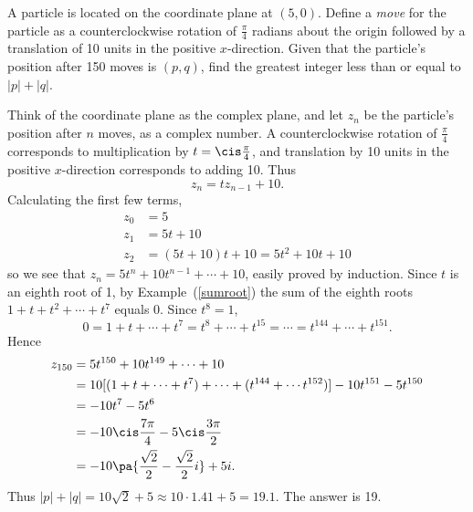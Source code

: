 \begin{ex}[AIME2 2008/9] 
A particle is located on the coordinate plane at $(5,0)$. Define a {\it move} for the particle as a counterclockwise rotation of $\frac{\pi}{4}$ radians about the origin followed by a translation of 10 units in the positive $x$-direction. Given that the particle's position after 150 moves is $(p,q)$, find the greatest integer less than or equal to $|p|+|q|$.
\end{ex}
 Think of the coordinate plane as the complex plane, and let $z_n$ be the particle's position after $n$ moves, as a complex number. A counterclockwise rotation of $\frac{\pi}{4}$ corresponds to multiplication by $t=\cis\frac{\pi}{4}%
$, and translation by 10 units in the positive $x$-direction corresponds to adding 10. Thus
\[z_n=tz_{n-1}+10.\]
Calculating the first few terms,
\begin{align*}
z_0&=5\\
z_1&=5t+10\\
z_2&=(5t+10)t+10=5t^2+10t+10
\end{align*}
so we see that $z_n=5t^n+10t^{n-1}+\cdots +10$, easily proved by induction. Since $t$ is an eighth root of 1, by Example~(\ref{sumroot}) the sum of the eighth roots $1+t+t^2+\cdots +t^7$ equals 0. Since $t^8=1$, 
\[0=1+t+\cdots +t^7=t^8+\cdots +t^{15}=\cdots =t^{144}+\cdots+ t^{151}.\]
Hence
\begin{align*}
z_{150}&=5t^{150}+10t^{149}+\cdots +10\\
&=10[(1+t+\cdots +t^7)+\cdots +(t^{144}+\cdots t^{152})]-10t^{151}-5t^{150}\\
&=-10t^7-5t^6\\
&=-10\cis \frac{7\pi}{4}-5\cis \frac{3\pi}2\\
&=-10\pa{\frac{\sqrt2}{2}-\frac{\sqrt2}{2}i}+5i.
\end{align*}
Thus $|p|+|q|=10\sqrt 2+5\approx 10\cdot 1.41+5=19.1$. The answer is 19.

